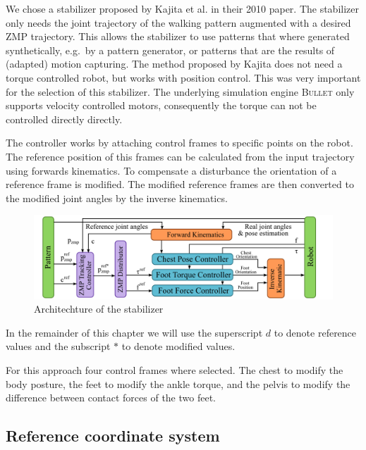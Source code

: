 \documentclass[english,ngerman]{KITreprt}
\newcommand{\name}[1]{\textsc{#1}}
\begin{document}
We chose a stabilizer proposed by Kajita et al. in their 2010 paper.
\cite{kajita2010biped} The stabilizer only needs the joint trajectory of
the walking pattern augmented with a desired ZMP trajectory. This allows
the stabilizer to use patterns that where generated synthetically,
e.g.~by a pattern generator, or patterns that are the results of
(adapted) motion capturing. The method proposed by Kajita does not need
a torque controlled robot, but works with position control. This was
very important for the selection of this stabilizer. The underlying
simulation engine \name{Bullet} only supports velocity controlled
motors, consequently the torque can not be controlled directly directly.

The controller works by attaching control frames to specific points on
the robot. The reference position of this frames can be calculated from
the input trajectory using forwards kinematics. To compensate a
disturbance the orientation of a reference frame is modified. The
modified reference frames are then converted to the modified joint
angles by the inverse kinematics.

\begin{figure}[tb]
\vspace*{-1em}
\includegraphics[width=\textwidth]{images/stabilizer_architechture.png}
\caption{Architechture of the stabilizer}
\label{img:archtitechture-stabiluzer}
\end{figure}

In the remainder of this chapter we will use the superscript $d$ to
denote reference values and the subscript $*$ to denote modified values.

For this approach four control frames where selected. The chest to
modify the body posture, the feet to modify the ankle torque, and the
pelvis to modify the difference between contact forces of the two feet.

\subsection{Reference coordinate
system}\label{reference-coordinate-system}
\end{document}
